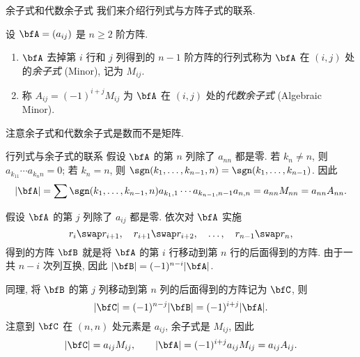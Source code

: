 \begin{frame}{余子式和代数余子式}
	\onslide<+->
	我们来介绍行列式与方阵子式的联系.
	\onslide<+->
	\begin{definition}
		设 $\bfA=(a_{ij})$ 是 $n\ge2$ 阶方阵.
		\begin{enumerate}
			\item $\bfA$ 去掉第 $i$ 行和 $j$ 列得到的 $n-1$ 阶方阵的行列式称为 $\bfA$ 在 $(i,j)$ 处的\emph{余子式} (Minor), 记为 $M_{ij}$.
			\item 称 $A_{ij}=(-1)^{i+j}M_{ij}$ 为 $\bfA$ 在 $(i,j)$ 处的\emph{代数余子式} (Algebraic Minor).
		\end{enumerate}
	\end{definition}
	\onslide<+->
	注意余子式和代数余子式是数而不是矩阵.
\end{frame}


\begin{frame}{行列式与余子式的联系\noexer}
	\onslide<+->
	假设 $\bfA$ 的第 $n$ 列除了 $a_{nn}$ 都是零.
	\onslide<+->
	若 $k_n\neq n$, 则 $a_{k_11}\cdots a_{k_nn}=0$; 若 $k_n=n$, 则 $\sgn(k_1,\dots,k_{n-1},n)=\sgn(k_1,\dots,k_{n-1})$.
	\onslide<+->
	因此
	\[|\bfA|=\sum \sgn(k_1,\dots,k_{n-1},n)a_{k_1,1}\cdots a_{k_{n-1},n-1}a_{n,n}=a_{nn} M_{nn}=a_{nn} A_{nn}.\]

	\onslide<+->
	假设 $\bfA$ 的第 $j$ 列除了 $a_{ij}$ 都是零.
	\onslide<+->
	依次对 $\bfA$ 实施
	\[r_i\swap r_{i+1},\quad r_{i+1}\swap r_{i+2},\quad\dots,\quad r_{n-1}\swap r_n,\]
	得到的方阵 $\bfB$ 就是将 $\bfA$ 的第 $i$ 行移动到第 $n$ 行的后面得到的方阵.
	\onslide<+->
	由于一共 $n-i$ 次列互换, 因此 $|\bfB|=(-1)^{n-i}|\bfA|$.

	\onslide<+->
	同理, 将 $\bfB$ 的第 $j$ 列移动到第 $n$ 列的后面得到的方阵记为 $\bfC$, 则
	\[|\bfC|=(-1)^{n-j}|\bfB|=(-1)^{i+j}|\bfA|.\]
	\onslide<+->
	注意到 $\bfC$ 在 $(n,n)$ 处元素是 $a_{ij}$, 余子式是 $M_{ij}$,
	\onslide<+->
	因此
	\[|\bfC|=a_{ij}M_{ij},\qquad |\bfA|=(-1)^{i+j}a_{ij}M_{ij}=a_{ij}A_{ij}.\]
\end{frame}


